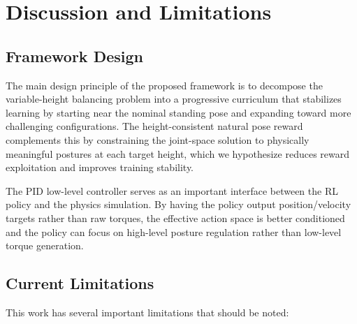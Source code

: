 \documentclass[conference]{IEEEtran}
\begin{document}
\section{Discussion and Limitations}
\label{sec:discussion}

\subsection{Framework Design}
The main design principle of the proposed framework is to decompose the variable-height balancing problem into a progressive curriculum that stabilizes learning by starting near the nominal standing pose and expanding toward more challenging configurations. The height-consistent natural pose reward complements this by constraining the joint-space solution to physically meaningful postures at each target height, which we hypothesize reduces reward exploitation and improves training stability.

The PID low-level controller serves as an important interface between the RL policy and the physics simulation. By having the policy output position/velocity targets rather than raw torques, the effective action space is better conditioned and the policy can focus on high-level posture regulation rather than low-level torque generation.

\subsection{Current Limitations}
This work has several important limitations that should be noted:
\end{document}
